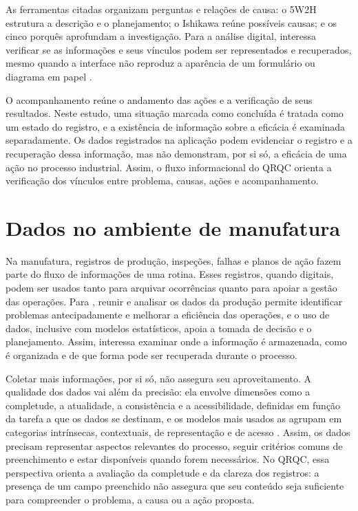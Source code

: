 As ferramentas citadas organizam perguntas e relações de causa: o 5W2H estrutura a descrição e o planejamento; o Ishikawa reúne possíveis causas; e os cinco porquês aprofundam a investigação. Para a análise digital, interessa verificar se as informações e seus vínculos podem ser representados e recuperados, mesmo quando a interface não reproduz a aparência de um formulário ou diagrama em papel \cite[p.~44--47]{rocha2012}.

O acompanhamento reúne o andamento das ações e a verificação de seus resultados. Neste estudo, uma situação marcada como concluída é tratada como um estado do registro, e a existência de informação sobre a eficácia é examinada separadamente. Os dados registrados na aplicação podem evidenciar o registro e a recuperação dessa informação, mas não demonstram, por si só, a eficácia de uma ação no processo industrial. Assim, o fluxo informacional do QRQC orienta a verificação dos vínculos entre problema, causas, ações e acompanhamento.

\section{Dados no ambiente de manufatura}

Na manufatura, registros de produção, inspeções, falhas e planos de ação fazem parte do fluxo de informações de uma rotina. Esses registros, quando digitais, podem ser usados tanto para arquivar ocorrências quanto para apoiar a gestão das operações. Para , reunir e analisar os dados da produção permite identificar problemas antecipadamente e melhorar a eficiência das operações, e o uso de dados, inclusive com modelos estatísticos, apoia a tomada de decisão e o planejamento. Assim, interessa examinar onde a informação é armazenada, como é organizada e de que forma pode ser recuperada durante o processo.

Coletar mais informações, por si só, não assegura seu aproveitamento. A qualidade dos dados vai além da precisão: ela envolve dimensões como a completude, a atualidade, a consistência e a acessibilidade, definidas em função da tarefa a que os dados se destinam, e os modelos mais usados as agrupam em categorias intrínsecas, contextuais, de representação e de acesso \cite[p.~24637--24638]{cichyrass2019}. Assim, os dados precisam representar aspectos relevantes do processo, seguir critérios comuns de preenchimento e estar disponíveis quando forem necessários. No QRQC, essa perspectiva orienta a avaliação da completude e da clareza dos registros: a presença de um campo preenchido não assegura que seu conteúdo seja suficiente para compreender o problema, a causa ou a ação proposta.


